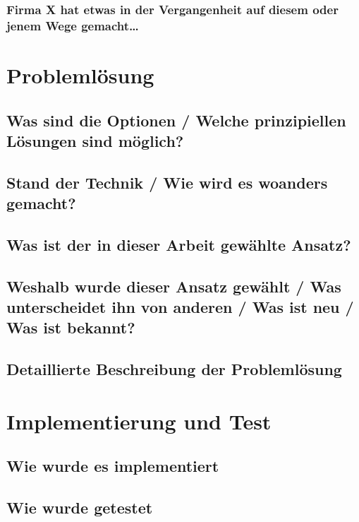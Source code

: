 \documentclass[a4paper,12pt]{article}
\begin{document}
\subsubsection{Firma X hat etwas in der Vergangenheit auf diesem oder jenem Wege gemacht…}

\section{Problemlösung}

\subsection{Was sind die Optionen / Welche prinzipiellen Lösungen sind möglich?}

\subsection{Stand der Technik / Wie wird es woanders gemacht?}

\subsection{Was ist der in dieser Arbeit gewählte Ansatz?}

\subsection{Weshalb wurde dieser Ansatz gewählt / Was unterscheidet ihn von anderen / Was ist neu / Was ist bekannt?}

\subsection{Detaillierte Beschreibung der Problemlösung}

\section{Implementierung und Test}

\subsection{Wie wurde es implementiert}

\subsection{Wie wurde getestet}
\end{document}
